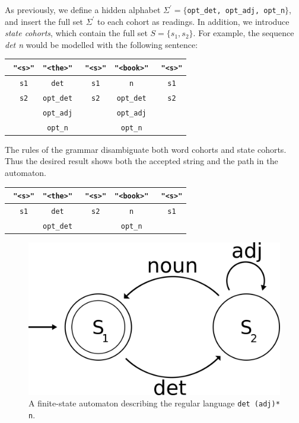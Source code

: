 \documentclass[11pt]{article}
\def\t#1{\texttt{#1}}
\def\h#1{{\tt \color{gray} #1}}
\def\swf{\h{"<s>"}}
\begin{document}
As previously, we define a hidden alphabet $\Sigma^{\prime} = \{$\t{opt\_det,
  opt\_adj, opt\_n}$\}$, and insert the full set $\Sigma^{\prime}$ to each
cohort as readings. In addition, we introduce \emph{state cohorts}, which
contain the full set $S = \{s_1, s_2\}$. For example, the sequence \emph{det n}
would be modelled with the following sentence:
%
\begin{table}[h]
  \centering\small
  \begin{tabular}{c|c|c|c|c}
    \swf   & \t{"<the>"}  & \swf   & \t{"<book>"} & \swf   \\ \hline
    \h{s1} & \t{det}      & \h{s1} & \t{n}        & \h{s1} \\
    \h{s2} & \t{opt\_det} & \h{s2} & \t{opt\_det} & \h{s2} \\
           & \t{opt\_adj} &        & \t{opt\_adj} &        \\
           & \t{opt\_n}   &        & \t{opt\_n}   &        
  \end{tabular}
\end{table}
%
The rules of the grammar disambiguate both word cohorts and state cohorts. Thus
the desired result shows both the accepted string and the path in the automaton.
%
\begin{table}[h]
  \centering\small
  \begin{tabular}{c|c|c|c|c}
    \swf   & \t{"<the>"}  & \swf   & \t{"<book>"} & \swf   \\ \hline
    \h{s1} & \t{det}      & \h{s2} & \t{n}        & \h{s1} \\
           & \t{opt\_det} &        & \t{opt\_n}   &  
  \end{tabular}
\end{table}
%
\begin{figure}[t]
  \centering
  \includegraphics[width=0.6\linewidth]{fsa.png}
  \caption{A finite-state automaton describing the regular language \t{det
      (adj)* n}.}
 \label{fig:fsa}
\end{figure}
\end{document}
